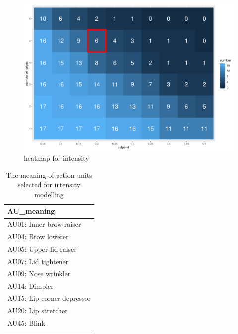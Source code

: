 \documentclass{monashthesis}
\begin{document}
\begin{figure}

{\centering \includegraphics[width=1\linewidth]{figures/heatmap-intensity-1} 

}

\caption{heatmap for intensity}\label{fig:heatmap-intensity}
\end{figure}

\begin{table}

\caption{\label{tab:au-intensity}The meaning of action units selected for intensity modelling }
\centering
\begin{tabular}[t]{l}
\hline
AU\_meaning\\
\hline
AU01: Inner brow raiser\\
\hline
AU04: Brow lowerer\\
\hline
AU05: Upper lid raiser\\
\hline
AU07: Lid tightener\\
\hline
AU09: Nose wrinkler\\
\hline
AU14: Dimpler\\
\hline
AU15: Lip corner depressor\\
\hline
AU20: Lip stretcher\\
\hline
AU45: Blink\\
\hline
\end{tabular}
\end{table}
\end{document}
